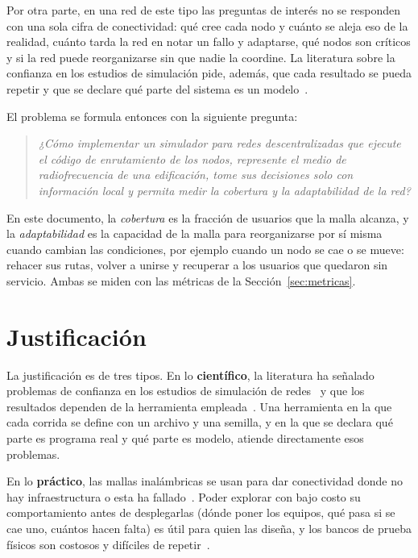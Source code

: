 Por otra parte, en una red de este tipo las preguntas de interés no se
responden con una sola cifra de conectividad: qué cree cada nodo y cuánto se
aleja eso de la realidad, cuánto tarda la red en notar un fallo y adaptarse, qué
nodos son críticos y si la red puede reorganizarse sin que nadie la coordine.
La literatura sobre la confianza en los estudios de simulación pide, además, que
cada resultado se pueda repetir y que se declare qué parte del sistema es un
modelo~\cite{Pawlikowski2002Credibility,Kurkowski2005Incredibles}.

El problema se formula entonces con la siguiente pregunta:

\begin{quote}
\textit{¿Cómo implementar un simulador para redes descentralizadas que ejecute
el código de enrutamiento de los nodos, represente el medio de radiofrecuencia
de una edificación, tome sus decisiones solo con información local y permita
medir la cobertura y la adaptabilidad de la red?}
\end{quote}

En este documento, la \textit{cobertura} es la fracción de usuarios que la malla
alcanza, y la \textit{adaptabilidad} es la capacidad de la malla para
reorganizarse por sí misma cuando cambian las condiciones, por ejemplo cuando un
nodo se cae o se mueve: rehacer sus rutas, volver a unirse y recuperar a los
usuarios que quedaron sin servicio. Ambas se miden con las métricas de la
Sección~\ref{sec:metricas}.

\section{Justificación}
\label{sec:justificacion}

La justificación es de tres tipos. En lo \textbf{científico}, la literatura ha
señalado problemas de confianza en los estudios de simulación de
redes~\cite{Kurkowski2005Incredibles,Pawlikowski2002Credibility} y que los
resultados dependen de la herramienta
empleada~\cite{Cavin2002Accuracy}. Una herramienta en la que cada corrida se
define con un archivo y una semilla, y en la que se declara qué parte es
programa real y qué parte es modelo, atiende directamente esos problemas.

En lo \textbf{práctico}, las mallas inalámbricas se usan para dar conectividad
donde no hay infraestructura o esta ha fallado~\cite{Akyildiz2005Mesh,Reina2015Disaster}.
Poder explorar con bajo costo su comportamiento antes de desplegarlas (dónde
poner los equipos, qué pasa si se cae uno, cuántos hacen falta) es útil para
quien las diseña, y los bancos de prueba físicos son costosos y difíciles de
repetir~\cite{Kiess2007RealWorld}.

